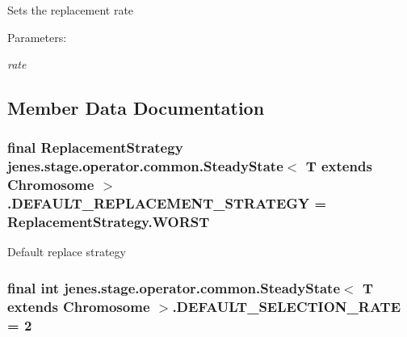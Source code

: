 Sets the replacement rate

\begin{Desc}
\item[Parameters:]
\begin{description}
\item[{\em rate}]\end{description}
\end{Desc}


\subsection{Member Data Documentation}
\hypertarget{classjenes_1_1stage_1_1operator_1_1common_1_1_steady_state_3_01_t_01extends_01_chromosome_01_4_4ed786deaaaefebd47fffc18e99b3710}{
\subsubsection[DEFAULT\_\-REPLACEMENT\_\-STRATEGY]{\setlength{\rightskip}{0pt plus 5cm}final {\bf ReplacementStrategy} jenes.stage.operator.common.SteadyState$<$ T extends Chromosome $>$.{\bf DEFAULT\_\-REPLACEMENT\_\-STRATEGY} = ReplacementStrategy.WORST}}
\label{classjenes_1_1stage_1_1operator_1_1common_1_1_steady_state_3_01_t_01extends_01_chromosome_01_4_4ed786deaaaefebd47fffc18e99b3710}


Default replace strategy \hypertarget{classjenes_1_1stage_1_1operator_1_1common_1_1_steady_state_3_01_t_01extends_01_chromosome_01_4_9d6bcfbcf1911ce2936e782e96919ebd}{
\subsubsection[DEFAULT\_\-SELECTION\_\-RATE]{\setlength{\rightskip}{0pt plus 5cm}final int jenes.stage.operator.common.SteadyState$<$ T extends Chromosome $>$.{\bf DEFAULT\_\-SELECTION\_\-RATE} = 2}}
\label{classjenes_1_1stage_1_1operator_1_1common_1_1_steady_state_3_01_t_01extends_01_chromosome_01_4_9d6bcfbcf1911ce2936e782e96919ebd}


